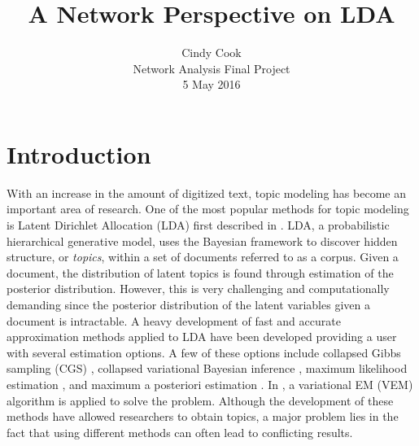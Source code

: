 \documentclass[12pt]{article}
\begin{document}
	\title{A Network Perspective on LDA}
	\author{Cindy Cook \\ \normalsize Network Analysis Final Project \\ \normalsize 5 May 2016}
	\date{}
	\maketitle

\section{Introduction}

With an increase in the amount of digitized text, topic modeling has become an important area of research. One of the most popular methods for topic modeling is Latent Dirichlet Allocation (LDA) first described in \cite{lda}. LDA, a probabilistic hierarchical generative model, uses the Bayesian framework to discover hidden structure, or \textit{topics},  within a set of documents referred to as a corpus. Given a document, the distribution of latent topics is found through estimation of the posterior distribution. However, this is very challenging and computationally demanding since the posterior distribution of the latent variables given a document is intractable. A heavy development of fast and accurate approximation methods applied to LDA have been developed providing a user with several estimation options. A few of these options include collapsed Gibbs sampling (CGS) \cite{CGS}, collapsed variational Bayesian inference \cite{CVB}, maximum likelihood estimation \cite{ML}, and maximum a posteriori estimation \cite{MAP}. In \cite{lda}, a variational EM (VEM) algorithm is applied to solve the problem. Although the development of these methods have allowed researchers to obtain topics, a major problem lies in the fact that using different methods can often lead to conflicting results.
\\
\\
\end{document}
